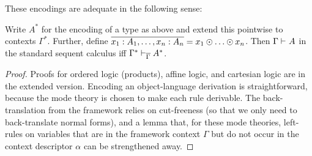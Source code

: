 These encodings are adequate in the following sense:
\begin{theorem}
Write $A^*$ for the encoding of a type as above and extend this
pointwise to contexts $\Gamma^*$.  Further, define
$\overline{x_1:A_1,\ldots,x_n:A_n} = x_1 \odot \ldots \odot x_n$.  Then
$\Gamma \vdash^{\mathsf{}} A$ in the standard sequent calculus iff
$\Gamma^* \vdash_{\overline{\Gamma}} A^*$.
\end{theorem}
\begin{proof}
Proofs for ordered logic (products), affine logic, and cartesian logic
are in the extended version. Encoding an object-language derivation is
straightforward, because the mode theory is chosen to make each rule
derivable.  The back-translation from the framework relies on
cut-freeness (so that we only need to back-translate normal forms), and
a lemma that, for these mode theories, left-rules on variables that are
in the framework context $\Gamma$ but do not occur in the context
descriptor $\alpha$ can be strengthened away.
\end{proof}

